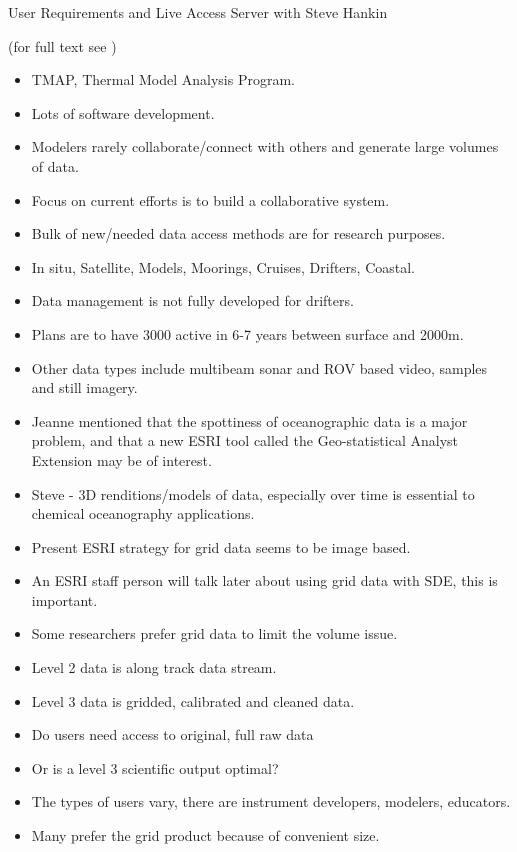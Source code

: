 User Requirements and Live Access Server with Steve Hankin

(for full text see )

\begin{itemize}
\item TMAP, Thermal Model Analysis Program.
\item Lots of software development.
\item Modelers rarely collaborate/connect with others and generate large volumes of data.
\item Focus on current efforts is to build a collaborative system.
\item Bulk of new/needed data access methods are for research purposes.
\item In situ, Satellite, Models, Moorings, Cruises, Drifters, Coastal.
\item Data management is not fully developed for drifters.
\item Plans are to have 3000 active in 6-7 years between surface and 2000m.
\item Other data types include multibeam sonar and ROV based video, samples and still 
imagery.
\item Jeanne mentioned that the spottiness of oceanographic data is a major problem, and that a 
new ESRI tool called the Geo-statistical Analyst Extension may be of interest.
\item Steve - 3D renditions/models of data, especially over time is essential to chemical 
oceanography applications.
\item Present ESRI strategy for grid data seems to be image based.
\item An ESRI staff person will talk later about using grid data with SDE, this is important.
\item Some researchers prefer grid data to limit the volume issue.
\item Level 2 data is along track data stream.
\item Level 3 data is gridded, calibrated and cleaned data.
\item Do users need access to original, full raw data\item Or is a level 3 scientific output optimal?
\item The types of users vary, there are instrument developers, modelers, educators.
\item Many prefer the grid product because of convenient size.
\end{itemize}

